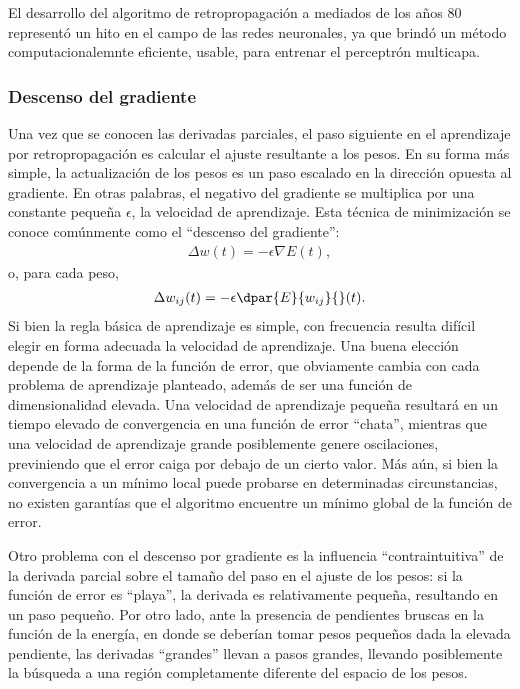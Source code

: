 El desarrollo del algoritmo de retropropagación a mediados de los años
80 representó un hito en el campo de las redes neuronales, ya
que brindó un método computacionalemnte eficiente, usable, para
entrenar el perceptrón multicapa.
%
\subsubsection{Descenso del gradiente}
%
Una vez que se conocen las derivadas parciales, el paso siguiente en
el aprendizaje por retropropagación es calcular el ajuste resultante a
los pesos. En su forma más simple, la actualización de los pesos es un
paso escalado en la dirección opuesta al gradiente.  En otras
palabras, el negativo del gradiente se multiplica por una constante
pequeña $\epsilon$, la velocidad de aprendizaje. Esta técnica de
minimización se conoce comúnmente como el ``descenso del gradiente'':
%
\begin{align}\label{mlp6}
  \Delta w(t) = - \epsilon \nabla E(t),
\end{align}
%
o, para cada peso,
%
\begin{align}\label{mlp6}
  \Delta w_{ij}(t) = - \epsilon \dpar{E}{w_{ij}}{}(t).
\end{align}
%
Si bien la regla básica de aprendizaje es simple, con frecuencia
resulta difícil elegir en forma adecuada la velocidad de
aprendizaje. Una buena elección depende de la forma de la función de
error, que obviamente cambia con cada problema de aprendizaje
planteado, además de ser una función de dimensionalidad elevada.  Una
velocidad de aprendizaje pequeña resultará en un tiempo elevado de
convergencia en una función de error ``chata'', mientras que una velocidad
de aprendizaje grande posiblemente genere oscilaciones, previniendo
que el error caiga por debajo de un cierto valor.  Más aún, si bien la
convergencia a un mínimo local puede probarse en determinadas
circunstancias, no existen garantías que el algoritmo encuentre un
mínimo global de la función de error.

Otro problema con el descenso por gradiente es la influencia
``contraintuitiva'' de la derivada parcial sobre el tamaño del paso en
el ajuste de los pesos: si la función de error es ``playa'', la
derivada es relativamente pequeña, resultando en un paso pequeño.  Por
otro lado, ante la presencia de pendientes bruscas en la función de
la energía, en donde se deberían tomar pesos pequeños dada la
elevada pendiente, las derivadas ``grandes'' llevan a pasos grandes,
llevando posiblemente la búsqueda a una región completamente diferente
del espacio de los pesos.

